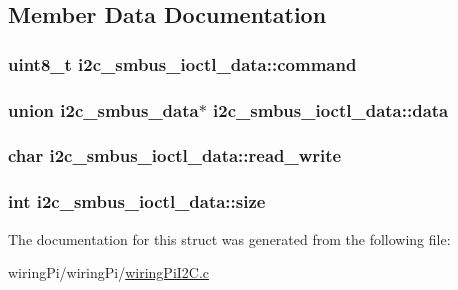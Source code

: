 \subsection{Member Data Documentation}
\hypertarget{structi2c__smbus__ioctl__data_adaacbd70d47e01e8bca1457b721089e7}{
\subsubsection[{command}]{\setlength{\rightskip}{0pt plus 5cm}uint8\-\_\-t i2c\-\_\-smbus\-\_\-ioctl\-\_\-data\-::command}}\label{structi2c__smbus__ioctl__data_adaacbd70d47e01e8bca1457b721089e7}
\hypertarget{structi2c__smbus__ioctl__data_af5a53e4ed38f278bd5fb62a65b67432d}{
\subsubsection[{data}]{\setlength{\rightskip}{0pt plus 5cm}union {\bf i2c\-\_\-smbus\-\_\-data}$\ast$ i2c\-\_\-smbus\-\_\-ioctl\-\_\-data\-::data}}\label{structi2c__smbus__ioctl__data_af5a53e4ed38f278bd5fb62a65b67432d}
\hypertarget{structi2c__smbus__ioctl__data_add449c765b690f883e5771132d16a4f8}{
\subsubsection[{read\-\_\-write}]{\setlength{\rightskip}{0pt plus 5cm}char i2c\-\_\-smbus\-\_\-ioctl\-\_\-data\-::read\-\_\-write}}\label{structi2c__smbus__ioctl__data_add449c765b690f883e5771132d16a4f8}
\hypertarget{structi2c__smbus__ioctl__data_a777bacfabf66ba077b40d1c835c7879f}{
\subsubsection[{size}]{\setlength{\rightskip}{0pt plus 5cm}int i2c\-\_\-smbus\-\_\-ioctl\-\_\-data\-::size}}\label{structi2c__smbus__ioctl__data_a777bacfabf66ba077b40d1c835c7879f}


The documentation for this struct was generated from the following file\-:\begin{DoxyCompactItemize}
\item 
wiring\-Pi/wiring\-Pi/\hyperlink{wiringPiI2C_8c}{wiring\-Pi\-I2\-C.\-c}\end{DoxyCompactItemize}
